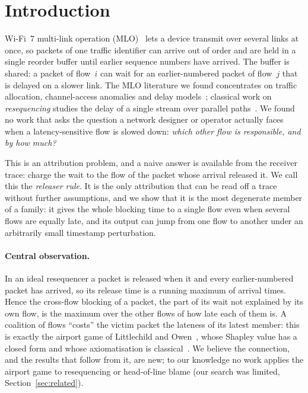 \documentclass[11pt]{article}
\theoremstyle{definition}
\begin{document}
\section{Introduction}
Wi-Fi~7 multi-link operation (MLO)~\cite{ieee80211be2024} lets a device transmit over several links at once, so packets of one traffic identifier can arrive out of order and are held in a single reorder buffer until earlier sequence numbers have arrived.
The buffer is shared: a packet of flow~$i$ can wait for an earlier-numbered packet of flow~$j$ that is delayed on a slower link.
The MLO literature we found concentrates on traffic allocation, channel-access anomalies and delay models~\cite{lopezraventos2022mlo,carrascosa2023understanding}; classical work on \emph{resequencing} studies the delay of a single stream over parallel paths~\cite{baccelli1984resequencing,han2005resequencing}.
We found no work that asks the question a network designer or operator actually faces when a latency-sensitive flow is slowed down: \emph{which other flow is responsible, and by how much?}

This is an attribution problem, and a naive answer is available from the receiver trace: charge the wait to the flow of the packet whose arrival released it.
We call this the \emph{releaser rule}.
It is the only attribution that can be read off a trace without further assumptions, and we show that it is the most degenerate member of a family: it gives the whole blocking time to a single flow even when several flows are equally late, and its output can jump from one flow to another under an arbitrarily small timestamp perturbation.

\paragraph{Central observation.}
In an ideal resequencer a packet is released when it and every earlier-numbered packet has arrived, so its release time is a running maximum of arrival times.
Hence the cross-flow blocking of a packet, the part of its wait not explained by its own flow, is the maximum over the other flows of how late each of them is.
A coalition of flows ``costs'' the victim packet the lateness of its latest member: this is exactly the airport game of Littlechild and Owen~\cite{littlechild1973airport}, whose Shapley value has a closed form and whose axiomatisation is classical~\cite{dubey1982airport}.
We believe the connection, and the results that follow from it, are new; to our knowledge no work applies the airport game to resequencing or head-of-line blame (our search was limited, Section~\ref{sec:related}).
\end{document}
